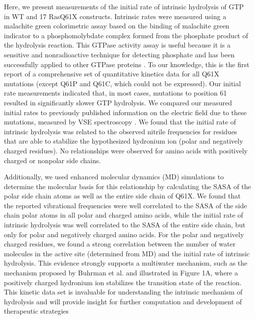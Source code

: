 Here, we present measurements of the initial rate of intrinsic hydrolysis of GTP in WT and 17 RasQ61X constructs. 
Intrinsic rates were measured using a malachite green colorimetric assay based on the binding of malachite green indicator to a phosphomolybdate complex formed from the phosphate product of the hydrolysis reaction. 
This GTPase activity assay is useful because it is a sensitive and nonradioactive technique for detecting phosphate and has been successfully applied to other GTPase proteins \cite{Quan2005}.
To our knowledge, this is the first report of a comprehensive set of quantitative kinetics data for all Q61X mutations (except Q61P and Q61C, which could not be expressed). 
Our initial rate measurements indicated that, in most cases, mutations to position 61 resulted in significantly slower GTP hydrolysis. 
We compared our measured initial rates to previously published information on the electric field due to these mutations, measured by VSE spectroscopy \cite{Stafford2012}.
We found that the initial rate of intrinsic hydrolysis was related to the observed nitrile frequencies for residues that are able to stabilize the hypothesized hydronium ion (polar and negatively charged residues). 
No relationships were observed for amino acids with positively charged or nonpolar side chains.

Additionally, we used enhanced molecular dynamics (MD) simulations to determine the molecular basis for this relationship by calculating the SASA of the polar side chain atoms as well as the entire side chain of Q61X. 
We found that the reported vibrational frequencies were well correlated to the SASA of the side chain polar atoms in all polar and charged amino acids, while the initial rate of intrinsic hydrolysis was well correlated to the SASA of the entire side chain, but only for polar and negatively charged amino acids. 
For the polar and negatively charged residues, we found a strong correlation between the number of water molecules in the active site (determined from MD) and the initial rate of intrinsic hydrolysis.
This evidence strongly supports a multiwater mechanism, such as the mechanism proposed by Buhrman et al. and illustrated in Figure 1A, where a positively charged hydronium ion stabilizes the transition state of the reaction. 
This kinetic data set is invaluable for understanding the intrinsic mechanism of hydrolysis and will provide insight for further computation and development of therapeutic strategies


